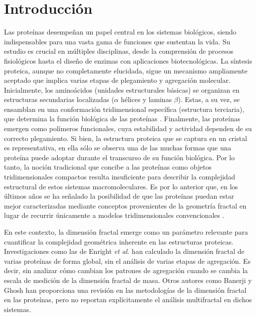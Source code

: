 \color{blue}

\chapter{Introducci\'{o}n}


Las proteínas desempeñan un papel central en los sistemas biológicos, siendo indispensables para una vasta gama de funciones que sustentan la vida. Su estudio es crucial en múltiples disciplinas, desde la comprensión de procesos fisiológicos hasta el diseño de enzimas con aplicaciones biotecnológicas. La síntesis proteica, aunque no completamente elucidada, sigue un mecanismo ampliamente aceptado que implica varias etapas de plegamiento y agregación molecular. Inicialmente, los aminoácidos (unidades estructurales básicas) se organizan en estructuras secundarias localizadas ($\alpha$ hélices y laminas $\beta$). Estas, a su vez, se ensamblan en una conformación tridimensional específica (estructura terciaria), que determina la función biológica de las proteínas \cite{Hardin2022}. Finalmente, las proteínas emergen como polímeros funcionales, cuya estabilidad y actividad dependen de su correcto plegamiento. Si bien, la estructura proteica que se captura en un cristal es representativa, en ella s\'{o}lo se observa una de las muchas formas que una prote\'{i}na puede adoptar durante el transcurso de su funci\'{o}n biol\'{o}gica. Por lo tanto, la noci\'{o}n tradicional que concibe a las prote\'{i}nas como objetos tridimensionales compactos resulta insuficiente para describir la complejidad estructural de estos sistemas macromoleculares. Es por lo anterior que, en los \'{u}ltimos años se ha señalado la posibilidad de que las prote\'{i}nas puedan estar mejor caracterizadas mediante conceptos provenientes de la geometr\'{i}a fractal en lugar de recurrir \'{u}nicamente a modelos tridimensionales convencionales \cite{Dewey1997, Mustafa1996, Vicsek1992, Cserzo1991}.

En este contexto, la dimensi\'{o}n fractal emerge como un par\'{a}metro relevante para cuantificar la complejidad geom\'{e}trica inherente en las estructuras proteicas. Investigaciones como las de Enright \textit{et al.} \cite{Enright2005} han calculado la dimensi\'{o}n fractal de varias prote\'{i}nas de forma global, sin el an\'{a}lisis de varias etapas de agregaci\'{o}n. Es decir, sin analizar c\'{o}mo cambian los patrones de agregaci\'{o}n cuando se cambia la escala de medici\'{o}n de la dimensi\'{o}n fractal de masa. Otros autores como Banerji y Ghosh \cite{Banerji2011} han proporciona una revisión en las metodologías de la dimensión fractal en las proteínas, pero no reportan explícitamente el análisis multifractal en dichos sistemas. 


